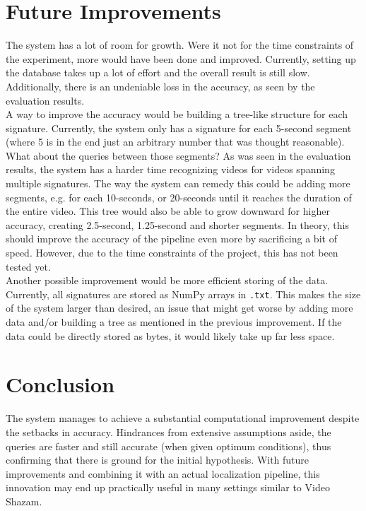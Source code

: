 \documentclass{article}
\newcommand\tab[1][1cm]{\hspace*{#1}}
\begin{document}
\section*{Future Improvements} \tab The system has a lot of room for growth. Were it not for the time constraints of the experiment, more would have been done and improved. Currently, setting up the database takes up a lot of effort and the overall result is still slow. Additionally, there is an undeniable loss in the accuracy, as seen by the evaluation results. 
\\\tab A way to improve the accuracy would be building a tree-like structure for each signature. Currently, the system only has a signature for each 5-second segment (where 5 is in the end just an arbitrary number that was thought reasonable). What about the queries between those segments? As was seen in the evaluation results, the system has a harder time recognizing videos for videos spanning multiple signatures. The way the system can remedy this could be adding more segments, e.g. for each 10-seconds, or 20-seconds until it reaches the duration of the entire video. This tree would also be able to grow downward for higher accuracy, creating 2.5-second, 1.25-second and shorter segments. In theory, this should improve the accuracy of the pipeline even more by sacrificing a bit of speed. However, due to the time constraints of the project, this has not been tested yet.\\
\tab Another possible improvement would be more efficient storing of the data. Currently, all signatures are stored as NumPy arrays in \texttt{.txt}. This makes the size of the system larger than desired, an issue that might get worse by adding more data and/or building a tree as mentioned in the previous improvement. If the data could be directly stored as bytes, it would likely take up far less space.

\section*{Conclusion}
\tab The system manages to achieve a substantial computational improvement despite the setbacks in accuracy. Hindrances from extensive assumptions aside, the queries are faster and still accurate (when given optimum conditions), thus confirming that there is ground for the initial hypothesis. With future improvements and combining it with an actual localization pipeline, this innovation may end up practically useful in many settings similar to Video Shazam.
    
\end{document}
